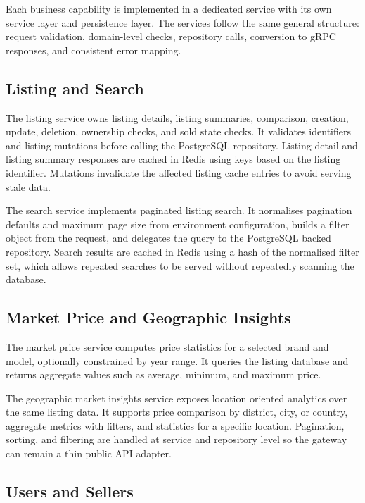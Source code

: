 Each business capability is implemented in a dedicated service with its own service layer and persistence layer. The services follow the same general structure: request validation, domain-level checks, repository calls, conversion to gRPC responses, and consistent error mapping.

\subsection{Listing and Search}

The listing service owns listing details, listing summaries, comparison, creation, update, deletion, ownership checks, and sold state checks. It validates identifiers and listing mutations before calling the PostgreSQL repository. Listing detail and listing summary responses are cached in Redis using keys based on the listing identifier. Mutations invalidate the affected listing cache entries to avoid serving stale data.

The search service implements paginated listing search. It normalises pagination defaults and maximum page size from environment configuration, builds a filter object from the request, and delegates the query to the PostgreSQL backed repository. Search results are cached in Redis using a hash of the normalised filter set, which allows repeated searches to be served without repeatedly scanning the database.

\subsection{Market Price and Geographic Insights}

The market price service computes price statistics for a selected brand and model, optionally constrained by year range. It queries the listing database and returns aggregate values such as average, minimum, and maximum price.

The geographic market insights service exposes location oriented analytics over the same listing data. It supports price comparison by district, city, or country, aggregate metrics with filters, and statistics for a specific location. Pagination, sorting, and filtering are handled at service and repository level so the gateway can remain a thin public API adapter.

\subsection{Users and Sellers}

